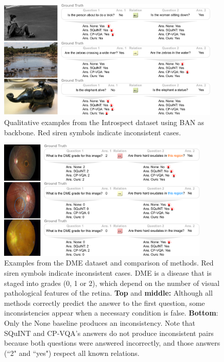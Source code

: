 \begin{figure}[!t]
\centering
\includegraphics[width=0.95\textwidth]{Figures/Part2_Consist/02_logic/examples_ban.pdf}
\caption{Qualitative examples from the Introspect dataset using BAN as backbone. Red siren symbols indicate inconsistent cases.}
\label{fig:examples_introspect}
\end{figure}
\begin{figure}[!t]
\centering
\includegraphics[width=0.90\textwidth]{Figures/Part2_Consist/02_logic/examples_dme.pdf}
\caption{Examples from the DME dataset and comparison of methods. Red siren symbols indicate inconsistent cases. DME is a disease that is staged into grades (0, 1 or 2), which depend on the number of visual pathological features of the retina. \textbf{Top} and \textbf{middle:} Although all methods correctly predict the answer to the first question, some inconsistencies appear when a necessary condition is false. \textbf{Bottom}: Only the None baseline produces an inconsistency. Note that SQuINT and CP-VQA's answers do not produce inconsistent pairs because both questions were answered incorrectly, and those answers (``2" and ``yes") respect all known relations. 
}
\label{fig:examples_dme}
\end{figure} 

